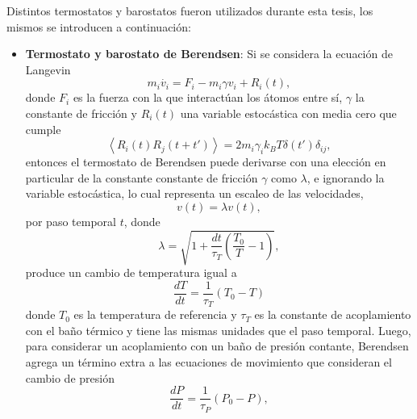 Distintos termostatos y barostatos fueron utilizados durante esta tesis, los 
mismos se introducen a continuación:
\begin{itemize}
    \item \textbf{Termostato y barostato de Berendsen}:
        Si se considera la ecuación de Langevin \cite{schneider1978}
        \begin{equation}\label{eq:langevin}
            m_i \dot{v_i} = F_i - m_i \gamma v_i + R_i(t),
        \end{equation}
        donde $F_i$ es la fuerza con la que interactúan los átomos entre sí, 
        $\gamma$ la constante de fricción y $R_i(t)$ una variable estocástica con 
        media cero que cumple 
        \begin{equation}
            \left\langle R_i(t) R_j(t+t') \right\rangle = 2m_i \gamma_i k_B T \delta(t') \delta_{ij},
        \end{equation}
        entonces el termostato de Berendsen \cite{berendsen1984} puede derivarse 
        con una elección en particular de la constante constante de fricción 
        $\gamma$ como $\lambda$, e ignorando la variable estocástica, lo cual 
        representa un escaleo de las velocidades,
        \begin{equation}
            v(t) = \lambda v(t),
        \end{equation}
        por paso temporal $t$, donde
        \begin{equation}
            \lambda = \sqrt{1 + \frac{dt}{\tau_T} \left( \frac{T_0}{T} - 1 \right)},
        \end{equation}
        produce un cambio de temperatura igual a
        \begin{equation}
            \frac{dT}{dt} = \frac{1}{\tau_T} (T_0 - T)
        \end{equation}
        donde $T_0$ es la temperatura de referencia y $\tau_T$ es la constante de
        acoplamiento con el baño térmico y tiene las mismas unidades que el paso 
        temporal. Luego, para considerar un acoplamiento con un baño de presión 
        contante, Berendsen \cite{berendsen1984} agrega un término extra a las 
        ecuaciones de movimiento que consideran el cambio de presión
        \begin{equation}
            \frac{dP}{dt} = \frac{1}{\tau_P} (P_0 - P),
        \end{equation}

\end{itemize}
